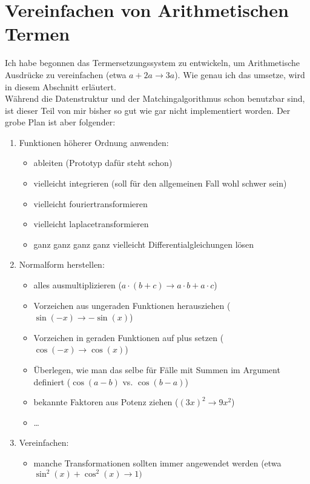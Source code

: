 \documentclass{article}
\begin{document}
\section{Vereinfachen von Arithmetischen Termen}
Ich habe begonnen das Termersetzungssystem zu entwickeln, um Arithmetische Ausdrücke zu vereinfachen (etwa $a + 2 a \rightarrow 3 a$). Wie genau ich das umsetze, wird in diesem Abschnitt erläutert.
\\Während die Datenstruktur und der Matchingalgorithmus schon benutzbar sind, ist dieser Teil von mir bisher so gut wie gar nicht implementiert worden. Der grobe Plan ist aber folgender:
\begin{enumerate}
    \item Funktionen höherer Ordnung anwenden:
    \begin{itemize}
        \item ableiten (Prototyp dafür steht schon)
        \item vielleicht integrieren (soll für den allgemeinen Fall wohl schwer sein)
        \item vielleicht fouriertransformieren
        \item vielleicht laplacetransformieren
        \item ganz ganz ganz ganz vielleicht Differentialgleichungen lösen
    \end{itemize}
    \item Normalform herstellen:
    \begin{itemize}
        \item alles ausmultiplizieren ($a\cdot (b + c) \rightarrow a\cdot b + a\cdot c$)
        \item Vorzeichen aus ungeraden Funktionen herausziehen ($\sin(-x) \rightarrow -\sin(x)$)
        \item Vorzeichen in geraden Funktionen auf plus setzen ($\cos(-x) \rightarrow \cos(x)$)
        \item Überlegen, wie man das selbe für Fälle mit Summen im Argument definiert ($\cos(a - b)$ vs. $\cos(b - a)$)
        \item bekannte Faktoren aus Potenz ziehen ($(3 x)^2 \rightarrow 9 x^2$)
        \item \dots
    \end{itemize}
    \item Vereinfachen:
    \begin{itemize}
        \item manche Transformationen sollten immer angewendet werden (etwa $\sin^2(x) + \cos^2(x) \rightarrow 1)$

\end{itemize}
\end{enumerate}
\end{document}
